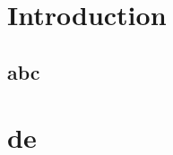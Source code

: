 \documentclass{article}
\begin{document}


\section{Introduction}
\subsection{abc}

\section{de}
\end{document}
